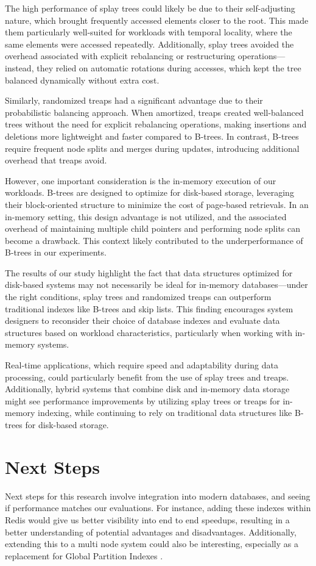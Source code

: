 \documentclass[sigconf]{acmart}
\begin{document}
The high performance of splay trees could likely be due to their self-adjusting nature, which brought frequently accessed elements closer to the root. This made them particularly well-suited for workloads with temporal locality, where the same elements were accessed repeatedly. Additionally, splay trees avoided the overhead associated with explicit rebalancing or restructuring operations---instead, they relied on automatic rotations during accesses, which kept the tree balanced dynamically without extra cost.

Similarly, randomized treaps had a significant advantage due to their probabilistic balancing approach. When amortized, treaps created well-balanced trees without the need for explicit rebalancing operations, making insertions and deletions more lightweight and faster compared to B-trees. In contrast, B-trees require frequent node splits and merges during updates, introducing additional overhead that treaps avoid.

However, one important consideration is the in-memory execution of our workloads. B-trees are designed to optimize for disk-based storage, leveraging their block-oriented structure to minimize the cost of page-based retrievals. In an in-memory setting, this design advantage is not utilized, and the associated overhead of maintaining multiple child pointers and performing node splits can become a drawback. This context likely contributed to the underperformance of B-trees in our experiments.

The results of our study highlight the fact that data structures optimized for disk-based systems may not necessarily be ideal for in-memory databases---under the right conditions, splay trees and randomized treaps can outperform traditional indexes like B-trees and skip lists. This finding encourages system designers to reconsider their choice of database indexes and evaluate data structures based on workload characteristics, particularly when working with in-memory systems.

Real-time applications, which require speed and adaptability during data processing, could particularly benefit from the use of splay trees and treaps. Additionally, hybrid systems that combine disk and in-memory data storage might see performance improvements by utilizing splay trees or treaps for in-memory indexing, while continuing to rely on traditional data structures like B-trees for disk-based storage.

\section{Next Steps}
Next steps for this research involve integration into modern databases, and seeing if performance matches our evaluations. For instance, adding these indexes within Redis would give us better visibility into end to end speedups, resulting in a better understanding of potential advantages and disadvantages. Additionally, extending this to a multi node system could also be interesting, especially as a replacement for Global Partition Indexes \cite{gpi}.

\clearpage



\end{document}
